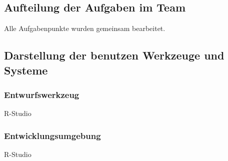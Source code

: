 \subsection*{Aufteilung der Aufgaben im Team}
Alle Aufgabenpunkte wurden gemeinsam bearbeitet.
\subsection*{Darstellung der benutzen Werkzeuge und Systeme}
\subsubsection*{Entwurfswerkzeug}
R-Studio
\subsubsection*{Entwicklungsumgebung}
R-Studio

